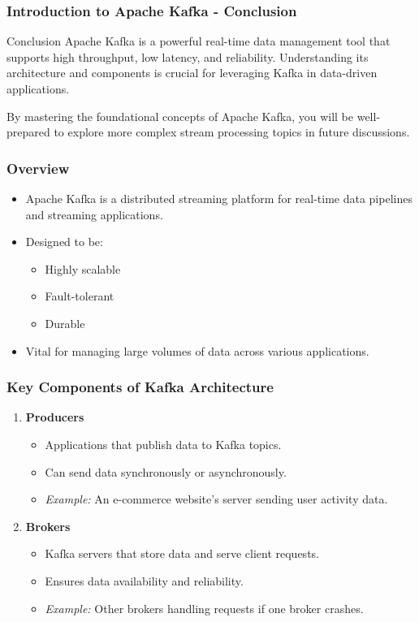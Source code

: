 \documentclass[aspectratio=169]{beamer}
\begin{document}
\begin{frame}[fragile]
    \frametitle{Introduction to Apache Kafka - Conclusion}
    \begin{block}{Conclusion}
        Apache Kafka is a powerful real-time data management tool that supports high throughput, low latency, and reliability. 
        Understanding its architecture and components is crucial for leveraging Kafka in data-driven applications.
    \end{block}
    By mastering the foundational concepts of Apache Kafka, you will be well-prepared to explore more complex stream processing topics in future discussions.
\end{frame}

\begin{frame}[fragile]
    \frametitle{Overview}
    \begin{itemize}
        \item Apache Kafka is a distributed streaming platform for real-time data pipelines and streaming applications.
        \item Designed to be:
            \begin{itemize}
                \item Highly scalable
                \item Fault-tolerant
                \item Durable
            \end{itemize}
        \item Vital for managing large volumes of data across various applications.
    \end{itemize}
\end{frame}

\begin{frame}[fragile]
    \frametitle{Key Components of Kafka Architecture}
    \begin{enumerate}
        \item \textbf{Producers}
            \begin{itemize}
                \item Applications that publish data to Kafka topics.
                \item Can send data synchronously or asynchronously.
                \item \textit{Example:} An e-commerce website's server sending user activity data.
            \end{itemize}

        \item \textbf{Brokers}
            \begin{itemize}
                \item Kafka servers that store data and serve client requests.
                \item Ensures data availability and reliability.
                \item \textit{Example:} Other brokers handling requests if one broker crashes.
            \end{itemize}
    \end{enumerate}
\end{frame}
\end{document}
